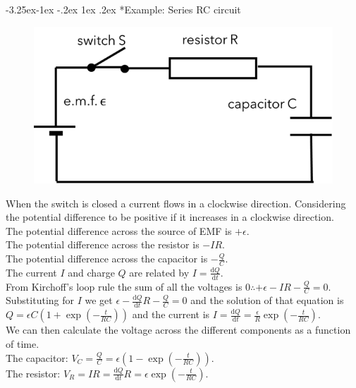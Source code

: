\documentclass[
]{book}
\makeatletter
\renewcommand\subsection{%
\@startsection{subsection}{2}{\z@}%
              {-3.25ex\@plus -1ex \@minus -.2ex}%
              {1ex \@plus .2ex}%
              {\sffamily\bfseries}}
\numberwithin{equation}{section}
\makeatother
\begin{document}
\hypertarget{example-series-rc-circuit}{%
\subsection*{Example: Series RC circuit}\label{example-series-rc-circuit}}

\begin{figure}

{\centering \includegraphics[width=0.7\linewidth]{Figures/seriesRC} 

}

\end{figure}

When the switch is closed a current flows in a clockwise direction.
Considering the potential difference to be positive if it increases in a
clockwise direction.\\
The potential difference across the source of EMF is \(+\epsilon\).\\
The potential difference across the resistor is \(-IR\).\\
The potential difference across the capacitor is \(-\frac{Q}{C}\).\\
The current \(I\) and charge \(Q\) are related by \(I = \frac{\mathrm{d} Q}{\mathrm{d} t}\).\\
From Kirchoff's loop rule the sum of all the voltages is
\(0 \therefore +\epsilon - IR - \frac{Q}{C} = 0\).\\
Substituting for \(I\) we get
\(\epsilon - \frac{\mathrm{d} Q}{\mathrm{d} t} R - \frac{Q}{C} = 0\) and the solution of
that equation is
\(Q = \epsilon C \left(1 + \exp⁡\left(-\frac{t}{RC} \right) \right)\) and
the current is
\(I = \frac{\mathrm{d} Q}{\mathrm{d} t} = \frac{\epsilon}{R} \exp\left( - \frac{t}{RC} \right)\).\\
We can then calculate the voltage across the different components as a
function of time.\\
The capacitor:
\(V_C = \frac{Q}{C} = \epsilon \left(1 - \exp⁡ \left(- \frac{t}{RC} \right) \right)\).\\
The resistor:
\(V_R = IR = \frac{\mathrm{d} Q}{\mathrm{d} t} R = \epsilon \exp⁡\left(- \frac{t}{RC} \right)\).
\end{document}
